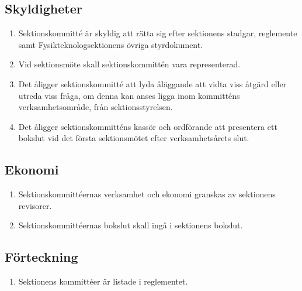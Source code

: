 \documentclass[11pt,a4paper]{article}
\begin{document}
\subsection{Skyldigheter}

\begin{enumerate}[\thesubsection .1]


    \item Sektionskommitté är skyldig att rätta sig efter sektionens stadgar,  reglemente samt Fysikteknologsektionens övriga styrdokument.
  
  \item Vid sektionsmöte skall sektionskommittén vara representerad.

  \item Det åligger sektionskommitté att lyda åläggande att vidta viss
  åtgärd eller utreda viss fråga, om denna kan anses ligga inom
  kommitténs verksamhetsområde, från sektionsstyrelsen.

  \item Det åligger sektionskommitténs kassör och ordförande att
  presentera ett bokslut vid det första sektionsmötet efter verksamhetsårets slut.

\end{enumerate}

\subsection{Ekonomi}

\begin{enumerate}[\thesubsection .1]

  \item Sektionskommittéernas verksamhet och ekonomi granskas av
  sektionens revisorer.

  \item Sektionskommittéernas bokslut skall ingå i sektionens bokslut.

\end{enumerate}

\subsection{Förteckning}

\begin{enumerate}[\thesubsection .1]

  \item Sektionens kommittéer är listade i reglementet.

\end{enumerate}
\end{document}
